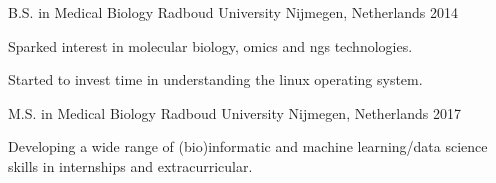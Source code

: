 

\begin{cventries}

  \cventry
    {B.S. in Medical Biology} %
    {Radboud University} %
    {Nijmegen, Netherlands} %
    {2014} %
    {
      \begin{cvitems} %
        \item {Sparked interest in molecular biology, omics and ngs technologies.}
        \item {Started to invest time in understanding the linux operating system.}
      \end{cvitems}
    }

  \cventry
    {M.S. in Medical Biology} %
    {Radboud University} %
    {Nijmegen, Netherlands} %
    {2017} %
    {
      \begin{cvitems} %
        \item {Developing a wide range of (bio)informatic and machine learning/data science skills in internships and extracurricular.}
      \end{cvitems}
    }


\end{cventries}